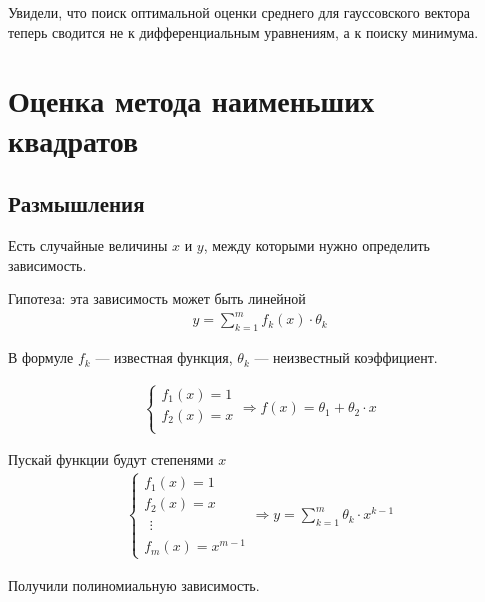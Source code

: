 Увидели, что поиск оптимальной оценки среднего для гауссовского вектора
теперь сводится не к дифференциальным уравнениям, а к поиску минимума.

\section{Оценка метода наименьших квадратов}

\subsection{Размышления}

Есть случайные величины $x$ и $y$, между которыми нужно определить зависимость.

Гипотеза: эта зависимость может быть линейной
\begin{align*}
    y = \sum_{k=1}^{m}f_k\left( x \right) \cdot \theta_k
\end{align*}

В формуле $f_k$ --- известная функция, $\theta_k$ --- неизвестный коэффициент.

\begin{example}
    \begin{align*}
        \begin{cases}
            f_1\left( x \right) = 1 \\
            f_2\left( x \right) = x \\
        \end{cases} \Rightarrow
        f\left( x \right) = \theta_1 + \theta_2 \cdot x
    \end{align*}
\end{example}

\begin{example}
    Пускай функции будут степенями $x$
    \begin{align*}
        \begin{cases}
            f_1\left( x \right) = 1 \\
            f_2\left( x \right) = x \\
            \begin{array}{c}
            \vdots
            \end{array} \\
            f_m\left( x \right) = x^{m-1}
        \end{cases} \Rightarrow
        y = \sum_{k=1}^{m} \theta_k \cdot x^{k-1}
    \end{align*}

    Получили полиномиальную зависимость.
\end{example}

